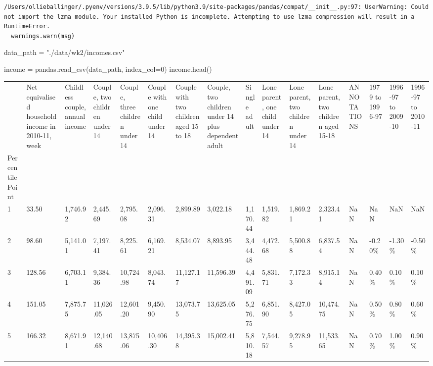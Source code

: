 \documentclass[
  letterpaper,
  DIV=11,
  numbers=noendperiod]{scrreprt}
\newenvironment{Shaded}{\begin{snugshade}}{\end{snugshade}}
\newcommand{\DecValTok}[1]{\textcolor[rgb]{0.68,0.00,0.00}{#1}}
\newcommand{\NormalTok}[1]{\textcolor[rgb]{0.00,0.23,0.31}{#1}}
\newcommand{\OperatorTok}[1]{\textcolor[rgb]{0.37,0.37,0.37}{#1}}
\newcommand{\StringTok}[1]{\textcolor[rgb]{0.13,0.47,0.30}{#1}}
\begin{document}
\begin{verbatim}
/Users/ollieballinger/.pyenv/versions/3.9.5/lib/python3.9/site-packages/pandas/compat/__init__.py:97: UserWarning: Could not import the lzma module. Your installed Python is incomplete. Attempting to use lzma compression will result in a RuntimeError.
  warnings.warn(msg)
\end{verbatim}

\begin{Shaded}
\begin{Highlighting}[]
\NormalTok{data\_path }\OperatorTok{=} \StringTok{"./data/wk2/incomes.csv"}

\NormalTok{income }\OperatorTok{=}\NormalTok{  pandas.read\_csv(data\_path, index\_col}\OperatorTok{=}\DecValTok{0}\NormalTok{)}
\NormalTok{income.head()}
\end{Highlighting}
\end{Shaded}

\begin{longtable}[]{@{}llllllllllllllll@{}}
\toprule()
& Net equivalised household income in 2010-11, week & Childless couple,
annual income & Couple, two children under 14 & Couple, three children
under 14 & Couple with one child under 14 & Couple with two children
aged 15 to 18 & Couple, two children under 14 plus dependent adult &
Single adult & Lone parent, one child under 14 & Lone parent, two
children under 14 & Lone parent, two children aged 15-18 & ANNOTATIONS &
1979 to 1996-97 & 1996-97 to 2009-10 & 1996-97 to 2010-11 \\
Percentile Point & & & & & & & & & & & & & & & \\
\midrule()
\endhead
1 & 33.50 & 1,746.92 & 2,445.69 & 2,795.08 & 2,096.31 & 2,899.89 &
3,022.18 & 1,170.44 & 1,519.82 & 1,869.21 & 2,323.41 & NaN & NaN & NaN &
NaN \\
2 & 98.60 & 5,141.01 & 7,197.41 & 8,225.61 & 6,169.21 & 8,534.07 &
8,893.95 & 3,444.48 & 4,472.68 & 5,500.88 & 6,837.54 & NaN & -0.20\% &
-1.30\% & -0.50\% \\
3 & 128.56 & 6,703.11 & 9,384.36 & 10,724.98 & 8,043.74 & 11,127.17 &
11,596.39 & 4,491.09 & 5,831.71 & 7,172.33 & 8,915.14 & NaN & 0.40\% &
0.10\% & 0.10\% \\
4 & 151.05 & 7,875.75 & 11,026.05 & 12,601.20 & 9,450.90 & 13,073.75 &
13,625.05 & 5,276.75 & 6,851.90 & 8,427.05 & 10,474.75 & NaN & 0.50\% &
0.80\% & 0.60\% \\
5 & 166.32 & 8,671.91 & 12,140.68 & 13,875.06 & 10,406.30 & 14,395.38 &
15,002.41 & 5,810.18 & 7,544.57 & 9,278.95 & 11,533.65 & NaN & 0.70\% &
1.00\% & 0.90\% \\
\bottomrule()
\end{longtable}
\end{document}
